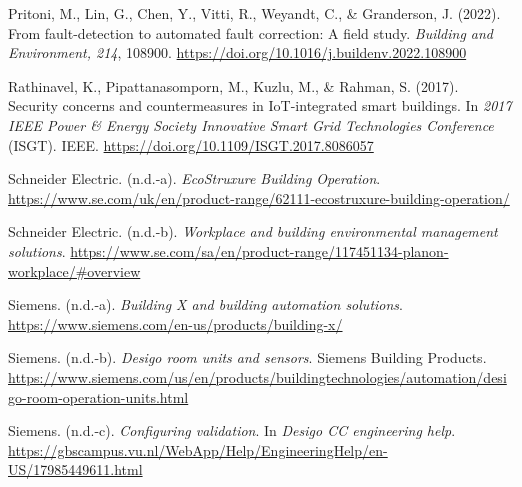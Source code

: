 \documentclass[11pt,a4paper]{article}
\begin{document}
Pritoni, M., Lin, G., Chen, Y., Vitti, R., Weyandt, C., \& Granderson, J. (2022). From fault-detection to automated fault correction: A field study. \textit{Building and Environment, 214}, 108900. \url{https://doi.org/10.1016/j.buildenv.2022.108900}

Rathinavel, K., Pipattanasomporn, M., Kuzlu, M., \& Rahman, S. (2017). Security concerns and countermeasures in IoT-integrated smart buildings. In \textit{2017 IEEE Power \& Energy Society Innovative Smart Grid Technologies Conference} (ISGT). IEEE. \url{https://doi.org/10.1109/ISGT.2017.8086057}

Schneider Electric. (n.d.-a). \textit{EcoStruxure Building Operation}. \url{https://www.se.com/uk/en/product-range/62111-ecostruxure-building-operation/}

Schneider Electric. (n.d.-b). \textit{Workplace and building environmental management solutions}. \url{https://www.se.com/sa/en/product-range/117451134-planon-workplace/\#overview}

Siemens. (n.d.-a). \textit{Building X and building automation solutions}. \url{https://www.siemens.com/en-us/products/building-x/}

Siemens. (n.d.-b). \textit{Desigo room units and sensors}. Siemens Building Products. \url{https://www.siemens.com/us/en/products/buildingtechnologies/automation/desigo-room-operation-units.html}

Siemens. (n.d.-c). \textit{Configuring validation}. In \textit{Desigo CC engineering help}. \url{https://gbscampus.vu.nl/WebApp/Help/EngineeringHelp/en-US/17985449611.html}

\endgroup
\end{document}
